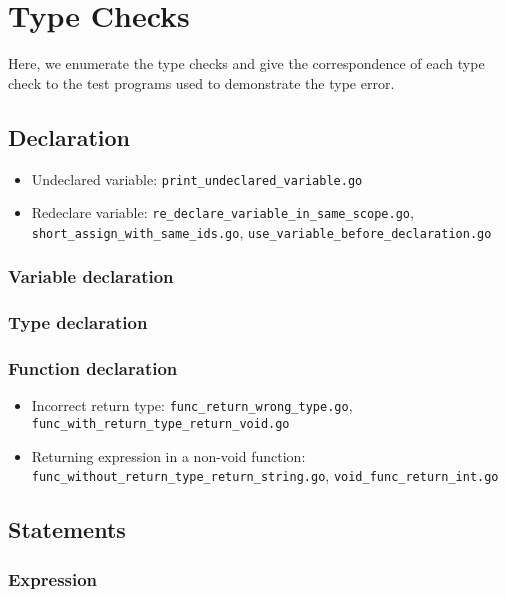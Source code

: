 \documentclass{article}
\begin{document}
\section*{Type Checks}

Here, we enumerate the type checks and give the correspondence of each type check to the test programs used to demonstrate the type error.

\subsection*{Declaration}

\begin{itemize}
\item Undeclared variable: \texttt{print_undeclared_variable.go}
\item Redeclare variable: \texttt{re_declare_variable_in_same_scope.go}, \texttt{short_assign_with_same_ids.go}, \texttt{use_variable_before_declaration.go}
\end{itemize}

\subsubsection*{Variable declaration}
\subsubsection*{Type declaration}

\subsubsection*{Function declaration}

\begin{itemize}
\item Incorrect return type: \texttt{func_return_wrong_type.go}, \texttt{func_with_return_type_return_void.go}
\item Returning expression in a non-void function: \texttt{func_without_return_type_return_string.go}, \texttt{void_func_return_int.go}
\end{itemize}

\subsection*{Statements}

\subsubsection*{Expression}
\end{document}
